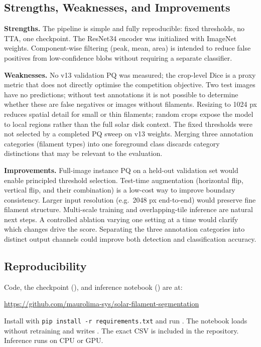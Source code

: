 \documentclass[sigconf]{acmart}
\begin{document}
\subsection{Strengths, Weaknesses, and Improvements}

\textbf{Strengths.} The pipeline is simple and fully reproducible:
fixed thresholds, no TTA, one checkpoint. The ResNet34 encoder was
initialized with ImageNet weights. Component-wise filtering (peak,
mean, area) is intended to reduce false positives from low-confidence
blobs without requiring a separate classifier.

\textbf{Weaknesses.} No v13 validation PQ was measured; the
crop-level Dice is a proxy metric that does not directly optimise
the competition objective. Two test images have no predictions; without test annotations it is
not possible to determine whether these are false negatives or images
without filaments. Resizing to
1024 px reduces spatial detail for small or thin filaments; random
crops expose the model to local regions rather than the full solar
disk context. The fixed thresholds were not selected by a completed
PQ sweep on v13 weights. Merging three annotation categories
(filament types) into one foreground class discards category
distinctions that may be relevant to the evaluation.

\textbf{Improvements.} Full-image instance PQ on a held-out
validation set would enable principled threshold selection.
Test-time augmentation (horizontal flip, vertical flip, and their
combination) is a low-cost way to improve boundary consistency.
Larger input resolution (e.g.\ 2048 px end-to-end) would preserve
fine filament structure. Multi-scale training and overlapping-tile
inference are natural next steps. A controlled ablation varying one
setting at a time would clarify which changes drive the score.
Separating the three annotation categories into distinct output
channels could improve both detection and classification accuracy.

\subsection{Reproducibility}

Code, the checkpoint (), and inference notebook
() are at:
\begin{center}
\url{https://github.com/maurolima-sys/solar-filament-segmentation}
\end{center}
Install with \texttt{pip install -r requirements.txt} and run
. The notebook loads 
without retraining and writes . The exact
CSV is included in the repository. Inference runs on CPU or GPU.
\end{document}
